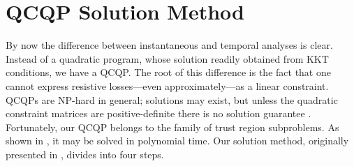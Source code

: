 \documentclass[journal,twoside]{IEEEtran}
\begin{document}
%



\section{QCQP Solution Method}\label{sec:solution}
By now the difference between instantaneous and temporal analyses is clear. Instead of a quadratic program, whose solution readily obtained from KKT conditions, we have a QCQP. The root of this difference is the fact that one cannot express resistive losses---even approximately---as a linear constraint. QCQPs are NP-hard in general; solutions may exist, but unless the quadratic constraint matrices are positive-definite there is no solution guarantee \cite{mehanna2014}. Fortunately, our QCQP belongs to the family of trust region subproblems. As shown in \cite{bienstock2014}, it may be solved in polynomial time. Our solution method, originally presented in \cite{kersulis2015}, divides into four steps.
\end{document}

